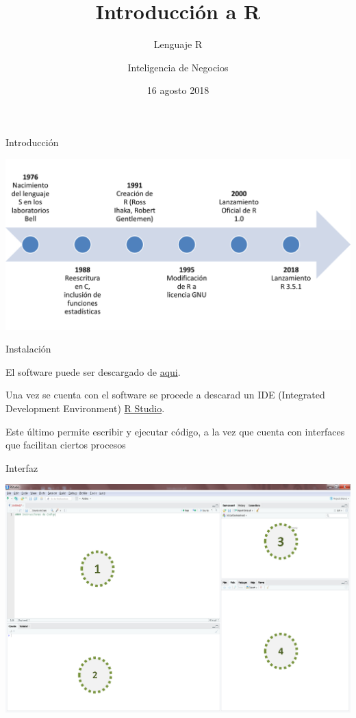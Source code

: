 \documentclass[ignorenonframetext,]{beamer}
\title{Introducción a R}
\subtitle{Lenguaje R}
\author{Inteligencia de Negocios}
\date{16 agosto 2018}
\begin{document}
\frame{\titlepage}

\begin{frame}{Introducción}

\begin{center}\includegraphics[width=1000px]{./img/img1} \end{center}

\end{frame}

\begin{frame}{Instalación}

El software puede ser descargado de
\href{https://cran.r-project.org/bin/windows/base/R-3.5.1-win.exe}{aqui}.

Una vez se cuenta con el software se procede a descarad un IDE
(Integrated Development Environment)
\href{https://www.rstudio.com/products/rstudio/download/\#download}{R
Studio}.

Este último permite escribir y ejecutar código, a la vez que cuenta con
interfaces que facilitan ciertos procesos

\end{frame}

\begin{frame}{Interfaz}

\begin{center}\includegraphics[width=800px]{./img/img2} \end{center}

\end{frame}
\end{document}
